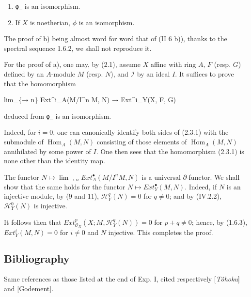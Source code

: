 \documentclass[
]{article}
\newenvironment{Shaded}{}{}
\newcommand{\NormalTok}[1]{#1}
\begin{document}
\begin{enumerate}
\def\labelenumi{\alph{enumi})}
\item
  \texttt{φ̲} is an isomorphism.
\item
  If \(X\) is noetherian, \(\phi\) is an isomorphism.
\end{enumerate}

The proof of b) being almost word for word that of (II 6 b)), thanks to
the spectral sequence 1.6.2, we shall not reproduce it.

For the proof of a), one may, by (2.1), assume \(X\) affine with ring
\(A\), \(F\) (resp. \(G\)) defined by an \(A\)-module \(M\) (resp.
\(N\)), and \(\mathcal{I}\) by an ideal \(I\). It suffices to prove that
the homomorphism

\begin{Shaded}
\begin{Highlighting}[]
\NormalTok{lim\_\{→ n\} Ext\^{}i\_A(M/I\^{}n M, N) → Ext\^{}i\_Y(X, F, G)}
\end{Highlighting}
\end{Shaded}

deduced from \texttt{φ̲} is an isomorphism.

Indeed, for \(i = 0\), one can canonically identify both sides of
(2.3.1) with the submodule of \(\operatorname{Hom}_{A}(M, N)\)
consisting of those elements of \(\operatorname{Hom}_{A}(M, N)\)
annihilated by some power of \(I\). One then sees that the homomorphism
(2.3.1) is none other than the identity map.

The functor \(N \mapsto \lim_{\to n} Ext^{\bullet}_{A}(M/I^{n} M, N)\)
is a universal \(\partial\)-functor. We shall show that the same holds
for the functor \(N \mapsto Ext^{\bullet}_{Y}(M, N)\). Indeed, if \(N\)
is an injective module, by (9 and 11), \(\mathcal{H}^{q}_{Y}(N) = 0\)
for \(q \neq 0\); and by (IV.2.2), \(\mathcal{H}^{0}_{Y}(N)\) is
injective.

It follows then that
\(Ext^{p}_{\mathcal{O}_{X}}(X; M, \mathcal{H}^{q}_{Y}(N)) = 0\) for
\(p + q \neq 0\); hence, by (1.6.3), \(Ext^{i}_{Y}(M, N) = 0\) for
\(i \neq 0\) and \(N\) injective. This completes the proof.

\subsection{Bibliography}\label{bibliography-1}

Same references as those listed at the end of Exp. I, cited respectively
{[}\emph{Tôhoku}{]} and {[}Godement{]}.
\end{document}
